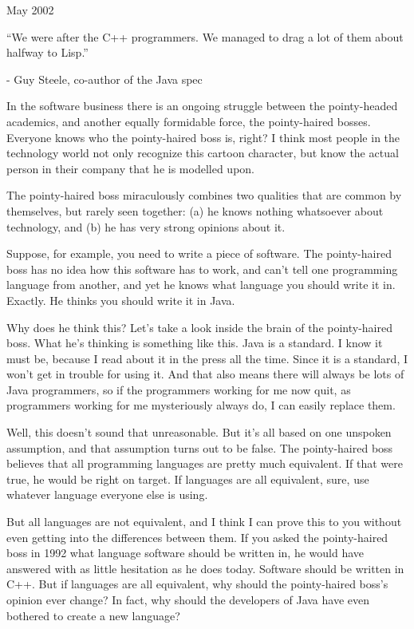 May 2002

``We were after the C++ programmers. We managed to drag a lot of them
about halfway to Lisp.''

- Guy Steele, co-author of the Java spec

In the software business there is an ongoing struggle between the
pointy-headed academics, and another equally formidable force, the
pointy-haired bosses. Everyone knows who the pointy-haired boss is,
right? I think most people in the technology world not only recognize
this cartoon character, but know the actual person in their company that
he is modelled upon.

The pointy-haired boss miraculously combines two qualities that are
common by themselves, but rarely seen together: (a) he knows nothing
whatsoever about technology, and (b) he has very strong opinions about
it.

Suppose, for example, you need to write a piece of software. The
pointy-haired boss has no idea how this software has to work, and can't
tell one programming language from another, and yet he knows what
language you should write it in. Exactly. He thinks you should write it
in Java.

Why does he think this? Let's take a look inside the brain of the
pointy-haired boss. What he's thinking is something like this. Java is a
standard. I know it must be, because I read about it in the press all
the time. Since it is a standard, I won't get in trouble for using it.
And that also means there will always be lots of Java programmers, so if
the programmers working for me now quit, as programmers working for me
mysteriously always do, I can easily replace them.

Well, this doesn't sound that unreasonable. But it's all based on one
unspoken assumption, and that assumption turns out to be false. The
pointy-haired boss believes that all programming languages are pretty
much equivalent. If that were true, he would be right on target. If
languages are all equivalent, sure, use whatever language everyone else
is using.

But all languages are not equivalent, and I think I can prove this to
you without even getting into the differences between them. If you asked
the pointy-haired boss in 1992 what language software should be written
in, he would have answered with as little hesitation as he does today.
Software should be written in C++. But if languages are all equivalent,
why should the pointy-haired boss's opinion ever change? In fact, why
should the developers of Java have even bothered to create a new
language?

